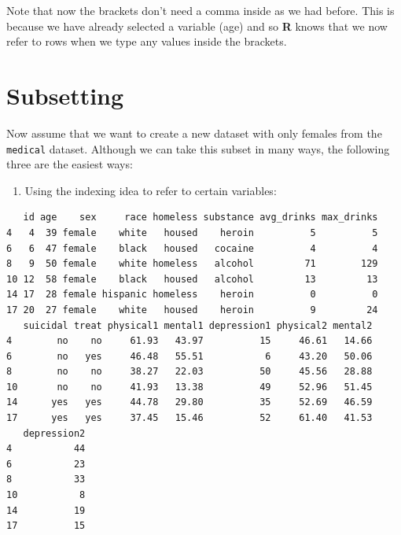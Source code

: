 \documentclass[]{book}
\newenvironment{Shaded}{\begin{snugshade}}{\end{snugshade}}
\newcommand{\KeywordTok}[1]{\textcolor[rgb]{0.13,0.29,0.53}{\textbf{#1}}}
\newcommand{\NormalTok}[1]{#1}
\newcommand{\OperatorTok}[1]{\textcolor[rgb]{0.81,0.36,0.00}{\textbf{#1}}}
\newcommand{\StringTok}[1]{\textcolor[rgb]{0.31,0.60,0.02}{#1}}
\providecommand{\tightlist}{%
  \setlength{\itemsep}{0pt}\setlength{\parskip}{0pt}}
\begin{document}
Note that now the brackets don't need a comma inside as we had before. This is because we have already selected a variable (age) and so \textbf{R} knows that we now refer to rows when we type any values inside the brackets.

\hypertarget{subsetting}{%
\section{Subsetting}\label{subsetting}}

Now assume that we want to create a new dataset with only females from the \texttt{medical} dataset. Although we can take this subset in many ways, the following three are the easiest ways:

\begin{enumerate}
\def\labelenumi{\arabic{enumi}.}
\tightlist
\item
  Using the indexing idea to refer to certain variables:
\end{enumerate}

\begin{Shaded}
\end{Shaded}

\begin{verbatim}
   id age    sex     race homeless substance avg_drinks max_drinks
4   4  39 female    white   housed    heroin          5          5
6   6  47 female    black   housed   cocaine          4          4
8   9  50 female    white homeless   alcohol         71        129
10 12  58 female    black   housed   alcohol         13         13
14 17  28 female hispanic homeless    heroin          0          0
17 20  27 female    white   housed    heroin          9         24
   suicidal treat physical1 mental1 depression1 physical2 mental2
4        no    no     61.93   43.97          15     46.61   14.66
6        no   yes     46.48   55.51           6     43.20   50.06
8        no    no     38.27   22.03          50     45.56   28.88
10       no    no     41.93   13.38          49     52.96   51.45
14      yes   yes     44.78   29.80          35     52.69   46.59
17      yes   yes     37.45   15.46          52     61.40   41.53
   depression2
4           44
6           23
8           33
10           8
14          19
17          15
\end{verbatim}
\end{document}
